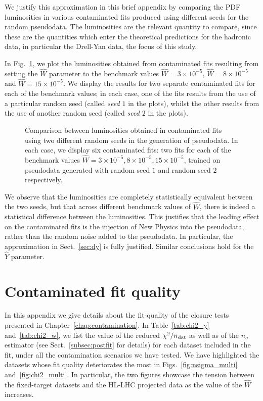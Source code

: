 \documentclass[withindex,glossary]{cam-thesis}
\begin{document}
We justify this approximation in this brief appendix by comparing the PDF luminosities in various contaminated fits produced using different seeds for the random pseudodata. The luminosities are the relevant quantity to compare, since these are the quantities which enter the theoretical predictions for the hadronic data, in particular the Drell-Yan data, the focus of this study.

In Fig.~\ref{fig:lumi_random}, we plot the luminosities obtained
from contaminated fits resulting from setting the $\hat{W}$ parameter to the benchmark values $\hat{W} = 3 \times 10^{-5}$, $\hat{W} = 8 \times 10^{-5}$ and $\hat{W} = 15 \times 10^{-5}$. We display the results for two separate contaminated fits for each of the benchmark values; in each case, one of the fits results from the use of a particular random seed (called \textit{seed $1$} in the plots), whilst the other results from the use of another random seed (called \textit{seed $2$} in the plots). 
 \begin{figure}[h!]
  \caption{Comparison between luminosities obtained in contaminated fits using two different random seeds in the generation of pseudodata. In each case, we display six contaminated fits: two fits for each of the benchmark values $\hat{W} = 3 \times 10^{-5}, 8 \times 10^{-5}, 15 \times 10^{-5}$, trained on pseudodata generated with random seed $1$ and random seed $2$ respectively.}
\label{fig:lumi_random}
\end{figure}
We observe that the luminosities are completely statistically equivalent between the two seeds, but that across different benchmark values of $\hat{W}$, there is indeed a statistical difference between the luminosities. This justifies that the leading effect on the contaminated fits is the injection of New Physics into the pseudodata, rather than the random noise added to the pseudodata. In particular, the approximation in Sect.~\ref{sec:dy} is fully justified. Similar conclusions hold for the $\hat{Y}$ parameter.


\chapter{Contaminated fit quality}
\label{app:fit}

In this appendix we give details about the fit-quality of the closure tests presented in Chapter~\ref{chap:contamination}.
In Table~\ref{tab:chi2_y} and~\ref{tab:chi2_w}, we list the value of the reduced $\chi^2/n_{\rm dat}$ 
as well as of the $n_\sigma$ estimator (see Sect.~\ref{subsec:postfit} for details) 
for each dataset included in the fit, under all the contamination scenarios we have tested. 
We have highlighted the datasets whose fit quality deteriorates the most in Figs.~\ref{fig:nsigma_multi} and~\ref{fig:chi2_multi}. 
In particular, the two figures showcase the tension between the fixed-target datasets and the HL-LHC projected data as the value of the $\hat{W}$ increases.
\end{document}
